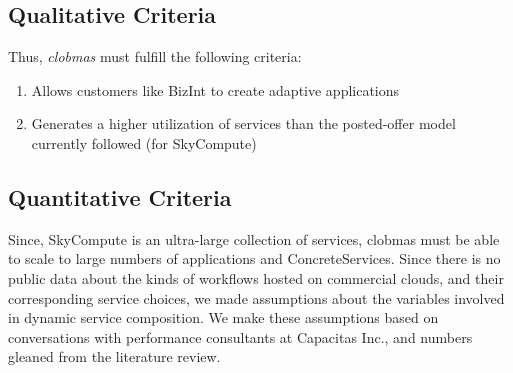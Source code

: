 \documentclass[10pt,journal,compsoc]{IEEEtran}
\begin{document}
\subsection{Qualitative Criteria}
Thus, \textit{clobmas} must fulfill the following criteria:
\begin{enumerate}
		\item Allows customers like BizInt to create adaptive applications
		\item Generates a higher utilization of services than the posted-offer model currently followed (for SkyCompute)
	\end{enumerate}

\subsection{Quantitative Criteria}
Since, SkyCompute is an ultra-large collection of services, clobmas must be able to scale to large numbers of applications and ConcreteServices. Since there is no public data about the kinds of workflows hosted on commercial clouds, and their corresponding service choices, we made assumptions about the variables involved in dynamic service composition. We make these assumptions based on conversations with performance consultants at Capacitas Inc., and numbers gleaned from the literature review.
       	  
\end{document}
